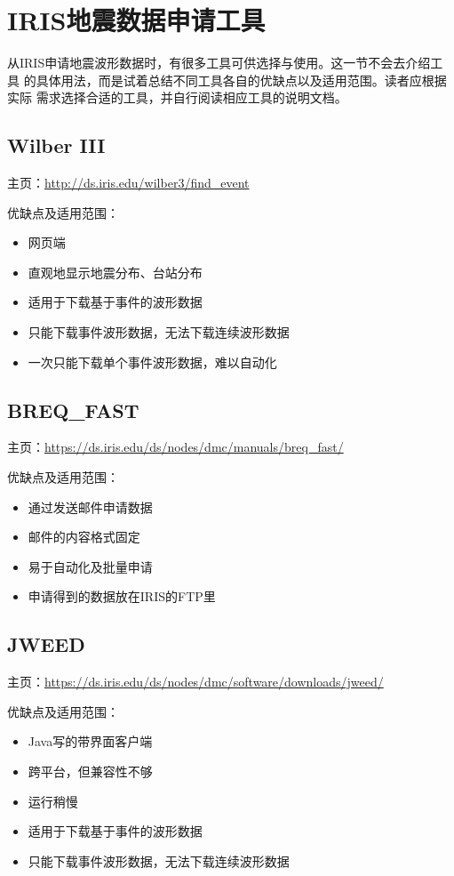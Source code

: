 \section{IRIS地震数据申请工具}
从IRIS申请地震波形数据时，有很多工具可供选择与使用。这一节不会去介绍工具
的具体用法，而是试着总结不同工具各自的优缺点以及适用范围。读者应根据实际
需求选择合适的工具，并自行阅读相应工具的说明文档。

\subsection{Wilber III}
\noindent 主页：\url{http://ds.iris.edu/wilber3/find_event}

\noindent 优缺点及适用范围：
\begin{itemize}
\item 网页端
\item 直观地显示地震分布、台站分布
\item 适用于下载基于事件的波形数据
\item 只能下载事件波形数据，无法下载连续波形数据
\item 一次只能下载单个事件波形数据，难以自动化
\end{itemize}

\subsection{BREQ\_FAST}
\noindent 主页：\url{https://ds.iris.edu/ds/nodes/dmc/manuals/breq_fast/}

\noindent 优缺点及适用范围：
\begin{itemize}
\item 通过发送邮件申请数据
\item 邮件的内容格式固定
\item 易于自动化及批量申请
\item 申请得到的数据放在IRIS的FTP里
\end{itemize}

\subsection{JWEED}
\noindent 主页：\url{https://ds.iris.edu/ds/nodes/dmc/software/downloads/jweed/}

\noindent 优缺点及适用范围：
\begin{itemize}
\item Java写的带界面客户端
\item 跨平台，但兼容性不够
\item 运行稍慢
\item 适用于下载基于事件的波形数据
\item 只能下载事件波形数据，无法下载连续波形数据
\end{itemize}


